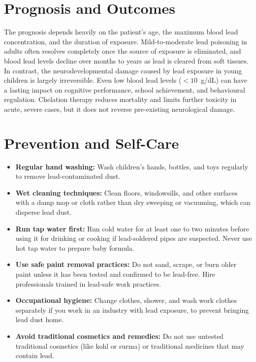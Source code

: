 \section*{Prognosis and Outcomes}
The prognosis depends heavily on the patient's age, the maximum blood lead concentration, and the duration of exposure. Mild-to-moderate lead poisoning in adults often resolves completely once the source of exposure is eliminated, and blood lead levels decline over months to years as lead is cleared from soft tissues. In contrast, the neurodevelopmental damage caused by lead exposure in young children is largely irreversible. Even low blood lead levels ($< 10$~\textmu{}g/dL) can have a lasting impact on cognitive performance, school achievement, and behavioural regulation. Chelation therapy reduces mortality and limits further toxicity in acute, severe cases, but it does not reverse pre-existing neurological damage.

\section*{Prevention and Self-Care}
\begin{itemize}
    \item \textbf{Regular hand washing:} Wash children's hands, bottles, and toys regularly to remove lead-contaminated dust.
    \item \textbf{Wet cleaning techniques:} Clean floors, windowsills, and other surfaces with a damp mop or cloth rather than dry sweeping or vacuuming, which can disperse lead dust.
    \item \textbf{Run tap water first:} Run cold water for at least one to two minutes before using it for drinking or cooking if lead-soldered pipes are suspected. Never use hot tap water to prepare baby formula.
    \item \textbf{Use safe paint removal practices:} Do not sand, scrape, or burn older paint unless it has been tested and confirmed to be lead-free. Hire professionals trained in lead-safe work practices.
    \item \textbf{Occupational hygiene:} Change clothes, shower, and wash work clothes separately if you work in an industry with lead exposure, to prevent bringing lead dust home.
    \item \textbf{Avoid traditional cosmetics and remedies:} Do not use untested traditional cosmetics (like kohl or surma) or traditional medicines that may contain lead.
\end{itemize}


